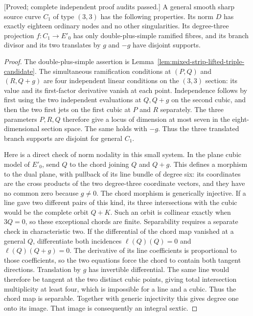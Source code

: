 \begin{lemma}
\label{lem:mixed-d3-cubic-norm-source-candidate}
\textup{[Proved; complete independent proof audits passed.]}
A general smooth sharp source curve $C_1$ of type $(3,3)$ has
the following properties. Its norm $D$ has exactly eighteen
ordinary nodes and no other singularities. Its degree-three
projection $f:C_1\to E'_0$ has only double-plus-simple ramified
fibres, and its branch divisor and its two translates by $g$
and $-g$ have disjoint supports.
\end{lemma}
\begin{proof}
The double-plus-simple assertion is
Lemma~\ref{lem:mixed-strip-lifted-triple-candidate}.
The simultaneous ramification conditions at $(P,Q)$ and
$(R,Q+g)$ are four independent linear conditions on the
$(3,3)$ section: its value and its first-factor derivative
vanish at each point. Independence follows by first using the
two independent evaluations at $Q,Q+g$ on the second cubic,
and then the two first jets on the first cubic at $P$ and $R$
separately. The three parameters $P,R,Q$ therefore give a locus
of dimension at most seven in the eight-dimensional section
space. The same holds with $-g$. Thus the three translated
branch supports are disjoint for general $C_1$.

Here is a direct check of norm nodality in this small system.
In the plane cubic model of $E'_0$, send $Q$ to the chord
joining $Q$ and $Q+g$. This defines a morphism to the dual plane,
with pullback of its line bundle of degree six: its coordinates
are the cross products of the two degree-three coordinate vectors,
and they have no common zero because $g\ne0$.
The chord morphism is generically injective. If a line gave two
different pairs of this kind, its three intersections with the
cubic would be the complete orbit $Q+K$. Such an orbit is
collinear exactly when $3Q=0$, so these exceptional chords are
finite. Separability requires a separate check in characteristic
 two. If the differential of the chord map vanished at a general
 $Q$, differentiate both incidences $\ell(Q)(Q)=0$ and
 $\ell(Q)(Q+g)=0$. The derivative of its line coefficients is
 proportional to those coefficients, so the two equations force
 the chord to contain both tangent directions. Translation by
 $g$ has invertible differential. The same line would therefore
 be tangent at the two distinct cubic points, giving total
 intersection multiplicity at least four, which is impossible
 for a line and a cubic. Thus the chord map is separable.
 Together with generic injectivity this gives degree one onto
 its image. That image is consequently an integral sextic.


\end{proof}
